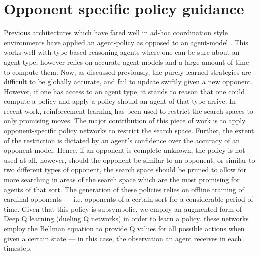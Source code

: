 \section{Opponent specific policy guidance}\label{Contribution}
Previous architectures which have fared well in ad-hoc coordination style environments have applied an agent-policy as opposed to an agent-model \cite{Barrett2015}. This works well with type-based reasoning agents where one can be sure about an agent type, however relies on accurate agent models and a large amount of time to compute them.
\newline \newline
Now, as discussed previously, the purely learned strategies are difficult to be globally accurate, and fail to update swiftly given a new opponent. However, if one has access to an agent type, it stands to reason that one could compute a policy and apply a policy should an agent of that type arrive.
\newline \newline
In recent work, reinforcement learning has been used to restrict the search spaces to only promising moves. The major contribution of this piece of work is to apply opponent-specific policy networks to restrict the search space. Further, the extent of the restriction is dictated by an agent's confidence over the accuracy of an opponent model. Hence, if an opponent is complete unknown, the policy is not used at all, however, should the opponent be similar to an opponent, or similar to two different types of opponent, the search space should be pruned to allow for more searching in areas of the search space which are the most promising for agents of that sort. 
\newline \newline
The generation of these policies relies on offline training of cardinal opponents --- i.e. opponents of a certain sort for a considerable period of time. Given that this policy is subsymbolic, we employ an augmented form of Deep Q learning (dueling Q networks) in order to learn a policy. these networks employ the Bellman equation to provide Q values for all possible actions when given a certain state --- in this case, the observation an agent receives in each timestep.

